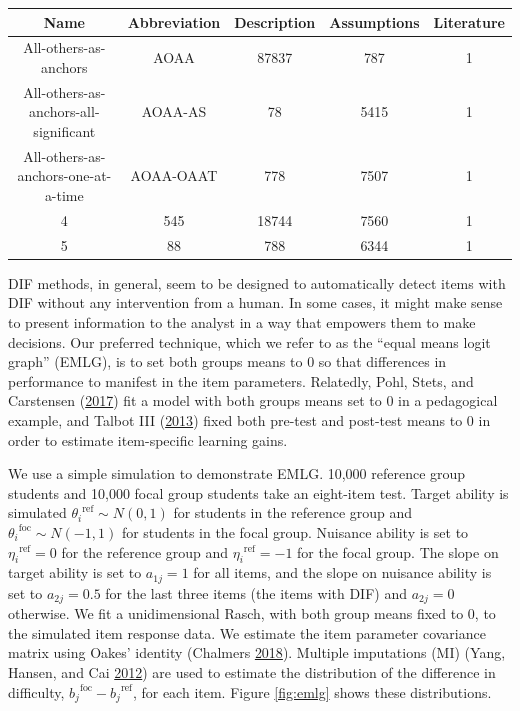 \documentclass[
  11pt,
]{article}
\begin{document}
\begin{center}
 \begin{tabular}{||c c c c c||} 
 \hline
 Name & Abbreviation & Description & Assumptions & Literature \\ [0.5ex] 
 \hline\hline
 All-others-as-anchors & AOAA & 87837 & 787 & 1\\ 
 \hline
 All-others-as-anchors-all-significant & AOAA-AS & 78 & 5415 & 1\\
 \hline
 All-others-as-anchors-one-at-a-time & AOAA-OAAT & 778 & 7507 & 1\\
 \hline
 4 & 545 & 18744 & 7560 & 1\\
 \hline
 5 & 88 & 788 & 6344 & 1\\ [1ex] 
 \hline
 \end{tabular}
\end{center}

DIF methods, in general, seem to be designed to automatically detect items with DIF without any intervention from a human. In some cases, it might make sense to present information to the analyst in a way that empowers them to make decisions. Our preferred technique, which we refer to as the \enquote{equal means logit graph} (EMLG), is to set both groups means to 0 so that differences in performance to manifest in the item parameters. Relatedly, Pohl, Stets, and Carstensen (\protect\hyperlink{ref-pohl2017cluster}{2017}) fit a model with both groups means set to 0 in a pedagogical example, and Talbot III (\protect\hyperlink{ref-talbot2013taking}{2013}) fixed both pre-test and post-test means to 0 in order to estimate item-specific learning gains.

We use a simple simulation to demonstrate EMLG. 10,000 reference group students and 10,000 focal group students take an eight-item test. Target ability is simulated \({\theta_i}^{\text{ref}} \sim N(0,1)\) for students in the reference group and \({\theta_i}^{\text{foc}} \sim N(-1,1)\) for students in the focal group. Nuisance ability is set to \({\eta_i}^{\text{ref}} = 0\) for the reference group and \({\eta_i}^{\text{ref}} = -1\) for the focal group. The slope on target ability is set to \(a_{1j} = 1\) for all items, and the slope on nuisance ability is set to \(a_{2j} = 0.5\) for the last three items (the items with DIF) and \(a_{2j} = 0\) otherwise. We fit a unidimensional Rasch, with both group means fixed to 0, to the simulated item response data. We estimate the item parameter covariance matrix using Oakes' identity (Chalmers \protect\hyperlink{ref-chalmers2018numerical}{2018}). Multiple imputations (MI) (Yang, Hansen, and Cai \protect\hyperlink{ref-yang2012characterizing}{2012}) are used to estimate the distribution of the difference in difficulty, \({b_j}^{\text{foc}} - {b_j}^{\text{ref}}\), for each item. Figure \ref{fig:emlg} shows these distributions.
\end{document}
